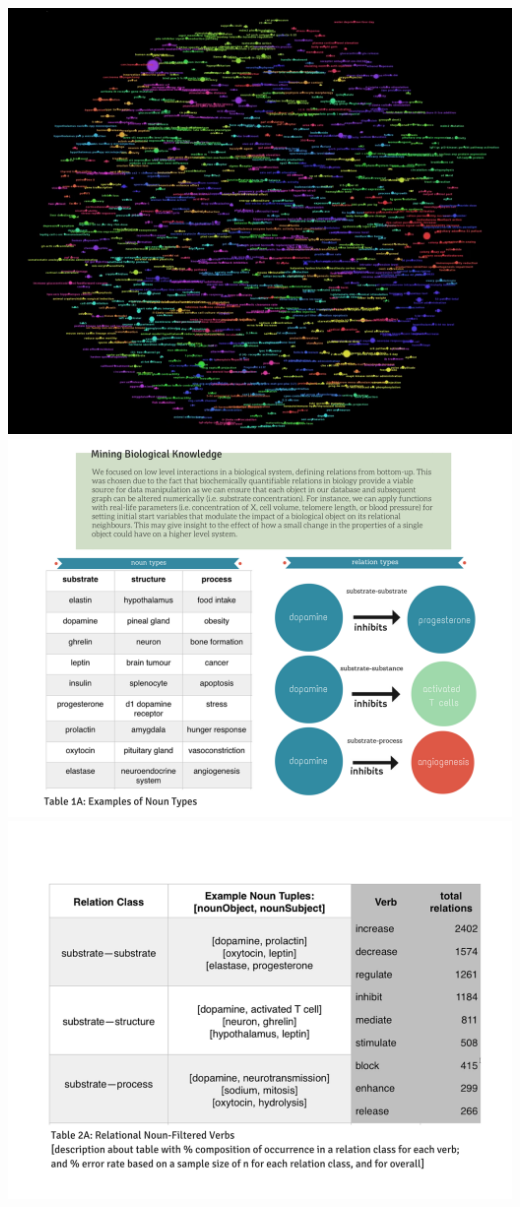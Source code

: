 \includegraphics[width=\textwidth]{media/model.png}
\includegraphics[width=\textwidth]{media/relation-examples.png}
\includegraphics[width=\textwidth]{media/text-analysis.png}
